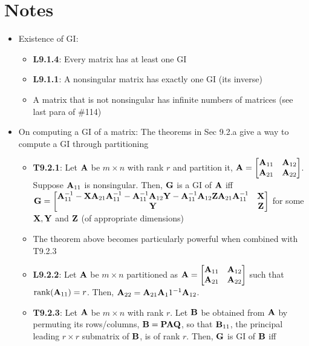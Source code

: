 \documentclass[a4paper, oneside]{book}
\begin{document}
\section*{Notes}
\begin{itemize}
\item Existence of GI:
	\begin{itemize}
	\item \textbf{L9.1.4}: Every matrix has at least one GI
	\item \textbf{L9.1.1}: A nonsingular matrix has exactly one GI (\ie its inverse)
	\item A matrix that is not nonsingular has infinite numbers of matrices (see last para of \#114)
	\end{itemize}
\item On computing a GI of a matrix: The theorems in Sec 9.2.a give a way to compute a GI through partitioning
\begin{itemize}
	\item \textbf{T9.2.1}: Let $\mathbf A$ be $m\times n$ with rank $r$ and partition it, $\mathbf A=\begin{bmatrix} \mathbf A_{11} & \mathbf A_{12} \\ \mathbf A_{21} & \mathbf A_{22} \end{bmatrix}$. Suppose $\mathbf A_{11}$ is nonsingular. Then, $\mathbf G$ is a GI of $\mathbf A$ iff 
	$\mathbf{G}=\begin{bmatrix}
	\mathbf A^{-1}_{11}-\mathbf{X}\mathbf A_{21} \mathbf A^{-1}_{11}-\mathbf A^{-1}_{11} \mathbf A_{12} \mathbf Y - \mathbf A^{-1}_{11} \mathbf A_{12} \mathbf{ZA}_{21}\mathbf A^{-1}_{11} & \mathbf X \\
	\mathbf Y & \mathbf Z
	\end{bmatrix}$ for some $\mathbf{X, Y}$ and $\mathbf Z$ (of appropriate dimensions)
	\item The theorem above becomes particularly powerful when combined with T9.2.3
	\item \textbf{L9.2.2}: Let $\mathbf{A}$ be $m\times n$ partitioned as $\mathbf{A} = \begin{bmatrix} \mathbf{A}_{11} & \mathbf A_{12} \\ \mathbf{A}_{21} & \mathbf{A}_{22} \end{bmatrix}$ such that $\text{rank}(\mathbf{A}_{11})=r$. Then, $\mathbf{A}_{22}=\mathbf{A}_{21}\mathbf{A}_11^{-1}\mathbf{A}_{12}$.
	\item \textbf{T9.2.3}: Let $\mathbf A$ be $m\times n$ with rank $r$. Let $\mathbf B$ be obtained from $\mathbf A$ by permuting its rows/columns, \ie $\mathbf{B=PAQ}$, so that $\mathbf{B}_{11}$, the principal leading $r\times r$ submatrix of $\mathbf{B}$, is of rank $r$. Then, $\mathbf G$ is GI of $\mathbf B$ iff 

\end{itemize}
\end{itemize}
\end{document}
